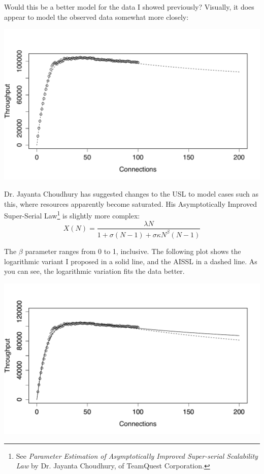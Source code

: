 \documentclass{vivid_layout}
\begin{document}
Would this be a better model for the data I showed previously? Visually, it does
appear to model the observed data somewhat more closely:
\begin{center}
\includegraphics[width=.85\linewidth]{scalability/logscale-2}
\end{center}

Dr. Jayanta Choudhury has suggested changes to the USL to model cases such as this,
where resources apparently become saturated.  His 
Asymptotically Improved Super-Serial Law\footnote{See {\itshape Parameter
Estimation of Asymptotically Improved Super-serial Scalability Law} by Dr.
Jayanta Choudhury, of TeamQuest Corporation.} is slightly more complex:
\begin{equation}
X(N) = \frac{\lambda N}{1 + \sigma(N-1) + \sigma \kappa N^\beta (N-1)}
\label{aissl}
\end{equation}

The $\beta$ parameter ranges from 0 to 1, inclusive. The following plot shows
the logarithmic variant I proposed in a solid line, and the AISSL in a dashed
line. As you can see, the logarithmic variation fits the data better.
\begin{center}
\includegraphics[width=.85\linewidth]{scalability/aissl}
\end{center}
\end{document}
